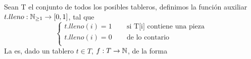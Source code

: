\documentclass[11pt, a4paper, twoside]{article}
\begin{document}










\begin{definicion}\label{def:ej3-objetivo}
Sean T el conjunto de todos los posibles tableros, 
definimos la función auxiliar 
$t.lleno: \mathbb{N}_{\geq 1} \rightarrow [0,1]$, tal que
\[
  \left\lbrace
  \begin{array}{l}
     t.lleno(i) = 1 ~~~~~~~~ \text{ si T[i] contiene una pieza} \\
     t.lleno(i) = 0 ~~~~~~~~ \text{ de lo contario} \\
  \end{array}
  \right.
\]
La  es, dado un tablero $t \in T$,
$f: T \rightarrow \mathbb{N}$, de la forma
\blue{
\[
f(T) := \nsum_{i=1}^{\#casilleros}{ t.lleno \bigg( {\large T\left(i\right)} \bigg) }
\]
}
\end{definicion}
\end{document}
